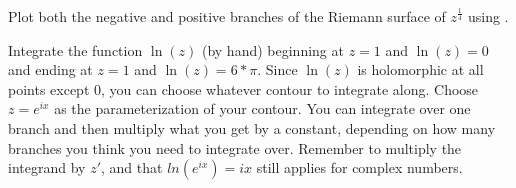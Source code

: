 \begin{problem}
Plot both the negative and positive branches of the Riemann surface of $z^{\frac{1}{4}}$ using .
\end{problem}

\begin{problem}
Integrate the function $\ln(z)$ (by hand) beginning at $z=1$ and $\ln(z)=0$ and ending at $z=1$ and $\ln(z)=6*\pi$.
Since $\ln(z)$ is holomorphic at all points except 0, you can choose whatever contour to integrate along. Choose $z=e^{ix}$ as the parameterization of your contour. You can integrate over one branch and then multiply what you get by a constant, depending on how many branches you think you need to integrate over. Remember to multiply the integrand by $z'$, and that $ln(e^{ix})=ix$ still applies for complex numbers.
\end{problem}
